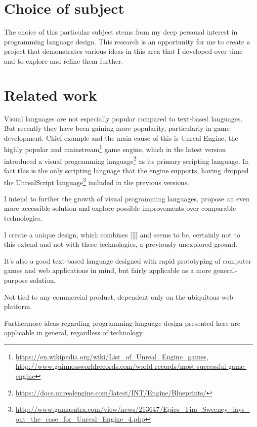 \section{Choice of subject}
The choice of this particular subject stems from my deep personal interest in programming language design. This research is an opportunity for me to create a project that demonstrates various ideas in this area that I developed over time and to explore and refine them further.


\section{Related work}
Visual languages are not especially popular compared to text-based languages. But recently they have been gaining more popularity, particularly in game development. Chief example and the main cause of this is Unreal Engine, the highly popular and mainstream\footnote{\url{https://en.wikipedia.org/wiki/List_of_Unreal_Engine_games}, \url{http://www.guinnessworldrecords.com/world-records/most-successful-game-engine}} game engine, which in the latest version introduced a visual programming language\footnote{\url{https://docs.unrealengine.com/latest/INT/Engine/Blueprints/}} as its primary scripting language. In fact this is the only scripting language that the engine supports, having dropped the UnrealScript language\footnote{\url{http://www.gamasutra.com/view/news/213647/Epics_Tim_Sweeney_lays_out_the_case_for_Unreal_Engine_4.php}} included in the previous versions. 

I intend to further the growth of visual programming languages, propose an even more accessible solution and explore possible improvements over comparable technologies.

I create a unique design, which combines [[]] and seems to be, certainly not to this extend and not with these technologies, a previously unexplored ground.

It's also a good text-based language designed with rapid prototyping of computer games and web applications in mind, but fairly applicable as a more general-purpose solution.

Not tied to any commercial product, dependent only on the ubiquitous web platform.

Furthermore ideas regarding programming language design presented here are applicable in general, regardless of technology.

